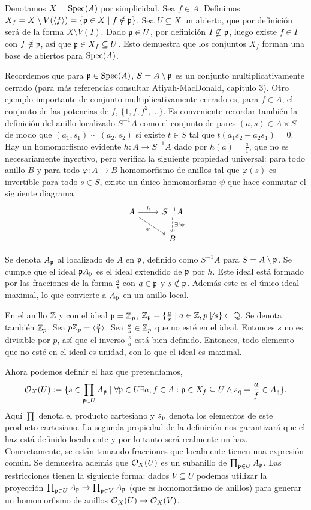 \documentclass[GA.tex]{subfiles}
\begin{document}
Denotamos $X=\operatorname{Spec}(A)$ por simplicidad. Sea $f\in A$. Definimos $X_f=X\setminus V(\langle{f}\rangle)=\{{\mathfrak{p}}\in X\mid f\notin{\mathfrak{p}}\}$. Sea $U\subseteq X$ un abierto, que por definición será de la forma $X\setminus V(I)$. Dado ${\mathfrak{p}}\in U$, por definición $I\not\subseteq{\mathfrak{p}}$, luego existe $f\in I$ con $f\notin{\mathfrak{p}}$, así que ${\mathfrak{p}}\in X_f\subseteq U$. Esto demuestra que los conjuntos $X_f$ forman una base de abiertos para $\operatorname{Spec}(A)$. 

Recordemos que para ${\mathfrak{p}}\in\operatorname{Spec}(A)$, $S=A\setminus{\mathfrak{p}}$ es un conjunto multiplicativamente cerrado (para más referencias consultar Atiyah-MacDonald, capítulo 3). Otro ejemplo importante de conjunto multiplicativamente cerrado es, para $f\in A$, el conjunto de las potencias de $f$, $\{1,f,f^2,\dots\}$. Es conveniente recordar también la definición del anillo localizado $S^{-1}A$ como el conjunto de pares $(a,s)\in A\times S$ de modo que $(a_1,s_1)\sim (a_2,s_2)$ si existe $t\in S$ tal que $t(a_1s_2-a_2s_1)=0$. Hay un homomorfismo evidente $h:A\to S^{-1}A$ dado por $h(a)=\frac{a}{1}$, que no es necesariamente inyectivo, pero verifica la siguiente propiedad universal: para todo anillo $B$ y para todo $\varphi:A\to B$ homomorfismo de anillos tal que $\varphi(s)$ es invertible para todo $s\in S$, existe un único homomorfismo $\psi$ que hace conmutar el siguiente diagrama
\[
\begin{tikzcd}
A\arrow[r, "h"]\arrow[dr, "\varphi"'] & S^{-1}A\arrow[d, dashed, "\exists!\psi"]\\
& B
\end{tikzcd}
\]

Se denota $A_{\mathfrak{p}}$ al localizado de $A$ en ${\mathfrak{p}}$, definido como $S^{-1}A$ para $S=A\setminus{\mathfrak{p}}$. Se cumple que el ideal ${\mathfrak{p}} A_{\mathfrak{p}}$ es el ideal extendido de ${\mathfrak{p}}$ por $h$. Este ideal está formado por las fracciones de la forma $\frac{a}{s}$ con $a\in{\mathfrak{p}}$ y $s\notin{\mathfrak{p}}$. Además este es el único ideal maximal, lo que convierte a $A_{\mathfrak{p}}$ en un anillo local. 

\begin{ej}
En el anillo $\mathbb{Z}$ y con el ideal ${\mathfrak{p}}=\mathbb{Z}_p$, $\mathbb{Z}_{\mathfrak{p}}=\{\frac{a}{s}\mid a\in\mathbb{Z}, p\not\mid s\}\subset\mathbb{Q}$. Se denota también $\mathbb{Z}_p$. Sea $p\mathbb{Z}_p=\langle{\frac{p}{1}}\rangle$. Sea $\frac{a}{s}\in\mathbb{Z}_p$ que no esté en el ideal. Entonces $s$ no es divisible por $p$, así que el inverso $\frac{s}{a}$ está bien definido. Entonces, todo elemento que no esté en el ideal es unidad, con lo que el ideal es maximal. 
\end{ej}

Ahora podemos definir el haz que pretendíamos, $${\mathcal O}_X(U):=\{s\in\prod_{{\mathfrak{p}}\in U}A_{\mathfrak{p}}\mid\forall{\mathfrak{p}}\in U\exists a,f\in A: {\mathfrak{p}}\in X_f\subseteq U\land s_{\mathfrak{q}}=\frac{a}{f}\in A_{\mathfrak{q}} \}.$$ Aquí $\prod$ denota el producto cartesiano y $s_{\mathfrak{p}}$ denota los elementos de este producto cartesiano. La segunda propiedad de la definición nos garantizará que el haz está definido localmente y por lo tanto será realmente un haz. Concretamente, se están tomando fracciones que localmente tienen una expresión común. Se demuestra además que ${\mathcal O}_X(U)$ es un subanillo de $\prod_{{\mathfrak{p}}\in U}A_{\mathfrak{p}}$. Las restricciones tienen la siguiente forma: dados $V\subseteq U$ podemos utilizar la proyección $\prod_{{\mathfrak{p}}\in U}A_{\mathfrak{p}}\to\prod_{{\mathfrak{p}}\in V}A_{\mathfrak{p}}$ (que es homomorfismo de anillos) para generar un homomorfismo de anillos ${\mathcal O}_X(U)\to{\mathcal O}_X(V)$. 
\end{document}
